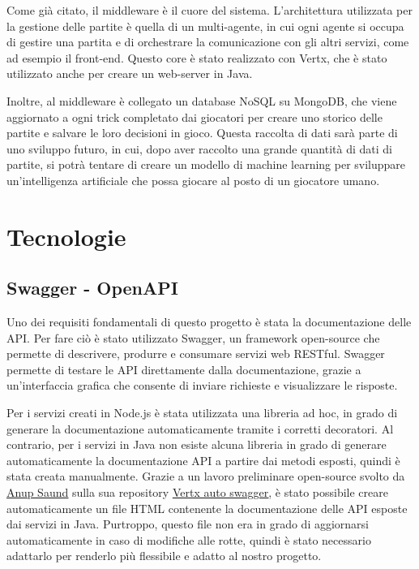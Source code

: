 Come già citato, il middleware è il cuore del sistema. L'architettura utilizzata per la gestione delle partite è quella di un multi-agente, in cui ogni agente si occupa di gestire una partita 
e di orchestrare la comunicazione con gli altri servizi, come ad esempio il front-end. Questo core è stato realizzato con Vertx, che è stato utilizzato anche per creare un web-server in Java.

Inoltre, al middleware è collegato un database NoSQL su MongoDB, che viene aggiornato a ogni trick completato dai giocatori per creare uno storico delle partite e salvare le loro decisioni in gioco. 
Questa raccolta di dati sarà parte di uno sviluppo futuro, in cui, dopo aver raccolto una grande quantità di dati di partite, si potrà tentare di creare un modello di machine learning per sviluppare un'intelligenza artificiale che possa giocare al posto di un giocatore umano.



\section{Tecnologie}
\subsection{Swagger - OpenAPI}

Uno dei requisiti fondamentali di questo progetto è stata la documentazione delle API.
Per fare ciò è stato utilizzato Swagger, un framework open-source che permette di descrivere, produrre e consumare servizi web RESTful. 
Swagger permette di testare le API direttamente dalla documentazione, grazie a un'interfaccia grafica che consente di inviare richieste e visualizzare le risposte.

\vspace{1cm}

Per i servizi creati in Node.js è stata utilizzata una libreria ad hoc, in grado di generare la documentazione automaticamente tramite i corretti decoratori.
Al contrario, per i servizi in Java non esiste alcuna libreria in grado di generare automaticamente la documentazione API a partire dai metodi esposti, quindi è stata creata manualmente.
Grazie a un lavoro preliminare open-source svolto da \href{https://github.com/anupsaund}{\underline{Anup Saund}} sulla sua repository \href{https://github.com/anupsaund/vertx-auto-swagger}{\underline{Vertx auto swagger}}, è stato possibile creare automaticamente un file HTML contenente la documentazione delle API esposte dai servizi in Java. 
Purtroppo, questo file non era in grado di aggiornarsi automaticamente in caso di modifiche alle rotte, quindi è stato necessario adattarlo per renderlo più flessibile e adatto al nostro progetto.

